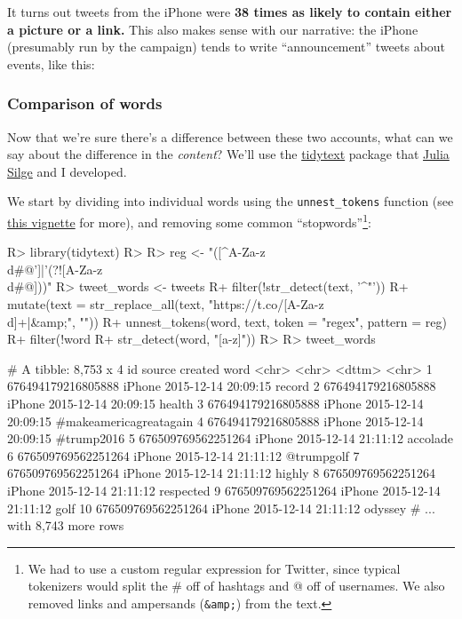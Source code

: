 \documentclass[
]{jss}
\begin{document}
It turns out tweets from the iPhone were \textbf{38 times as likely to
contain either a picture or a link.} This also makes sense with our
narrative: the iPhone (presumably run by the campaign) tends to write
``announcement'' tweets about events, like this:

\hypertarget{comparison-of-words}{%
\subsubsection{Comparison of words}\label{comparison-of-words}}

Now that we're sure there's a difference between these two accounts,
what can we say about the difference in the \emph{content}? We'll use
the \href{https://cran.r-project.org/web/packages/tidytext}{tidytext}
package that \href{http://juliasilge.com/}{Julia Silge} and I developed.

We start by dividing into individual words using the
\texttt{unnest\_tokens} function (see
\href{https://cran.r-project.org/web/packages/tidytext/vignettes/tidytext.html}{this
vignette} for more), and removing some common ``stopwords''\footnote{We
  had to use a custom regular expression for Twitter, since typical
  tokenizers would split the \# off of hashtags and @ off of usernames.
  We also removed links and ampersands (\texttt{\&amp;}) from the text.}:

\begin{CodeChunk}

\begin{CodeInput}
R> library(tidytext)
R> 
R> reg <- "([^A-Za-z\\d#@']|'(?![A-Za-z\\d#@]))"
R> tweet_words <- tweets %
R+   filter(!str_detect(text, '^"')) %
R+   mutate(text = str_replace_all(text, "https://t.co/[A-Za-z\\d]+|&amp;", "")) %
R+   unnest_tokens(word, text, token = "regex", pattern = reg) %
R+   filter(!word %
R+          str_detect(word, "[a-z]"))
R> 
R> tweet_words
\end{CodeInput}

\begin{CodeOutput}
# A tibble: 8,753 x 4
   id                 source created             word                  
   <chr>              <chr>  <dttm>              <chr>                 
 1 676494179216805888 iPhone 2015-12-14 20:09:15 record                
 2 676494179216805888 iPhone 2015-12-14 20:09:15 health                
 3 676494179216805888 iPhone 2015-12-14 20:09:15 #makeamericagreatagain
 4 676494179216805888 iPhone 2015-12-14 20:09:15 #trump2016            
 5 676509769562251264 iPhone 2015-12-14 21:11:12 accolade              
 6 676509769562251264 iPhone 2015-12-14 21:11:12 @trumpgolf            
 7 676509769562251264 iPhone 2015-12-14 21:11:12 highly                
 8 676509769562251264 iPhone 2015-12-14 21:11:12 respected             
 9 676509769562251264 iPhone 2015-12-14 21:11:12 golf                  
10 676509769562251264 iPhone 2015-12-14 21:11:12 odyssey               
# ... with 8,743 more rows
\end{CodeOutput}
\end{CodeChunk}
\end{document}

